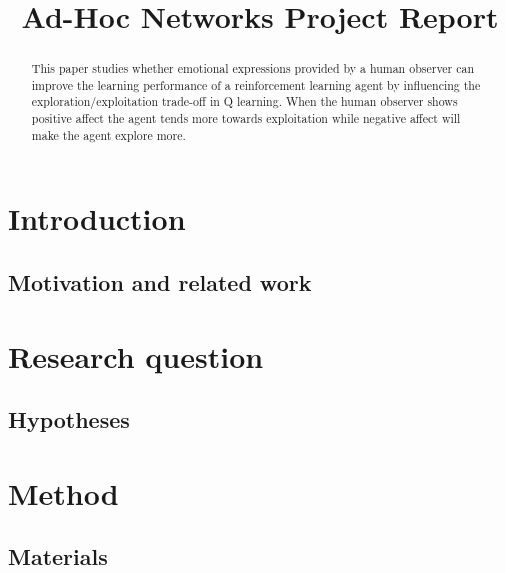 \documentclass[conference]{IEEEtran}
\begin{document}
\title{Ad-Hoc Networks Project Report}

\author{
}
\maketitle

\begin{abstract}
This paper studies whether emotional expressions provided by a human observer can improve the learning performance of a reinforcement learning agent by influencing the exploration/exploitation trade-off in Q learning. When the human observer shows positive affect the agent tends more towards exploitation while negative affect will make the agent explore more.
\end{abstract}


\section{Introduction}

\subsection{Motivation and related work}

\section{Research question}

\subsection{Hypotheses} 

\section{Method}

\subsection{Materials}
\end{document}
